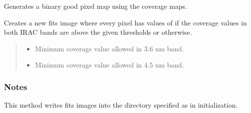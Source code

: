 \documentclass[letterpaper,12pt,english]{sphinxmanual}
\begin{document}
\begin{fulllineitems}
\begin{fulllineitems}
\label{\detokenize{api/selector:SPTclIRAGN.Pipeline_functions.SelectIRAGN.coverage_mask}}
\pysigstartsignatures
{}
\pysigstopsignatures
\sphinxAtStartPar
Generates a binary good pixel map using the coverage maps.

\sphinxAtStartPar
Creates a new fits image where every pixel has values of  if the coverage values in both IRAC bands are above
the given thresholds or  otherwise.
\begin{quote}\begin{description}
\begin{itemize}
\item {} 
\sphinxAtStartPar
{} \textendash{} Minimum coverage value allowed in 3.6 um band.

\item {} 
\sphinxAtStartPar
{} \textendash{} Minimum coverage value allowed in 4.5 um band.

\end{itemize}

\end{description}\end{quote}
\subsubsection*{Notes}

\sphinxAtStartPar
This method writes fits images into the directory specified as  in initialization.

\end{fulllineitems}



\end{fulllineitems}
\end{document}
